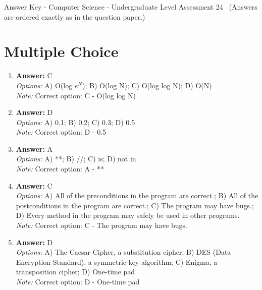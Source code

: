 \documentclass[12pt]{article}
\begin{document}
\begin{center}
Answer Key - Computer Science - Undergraduate Level Assessment 24 \
\small (Answers are ordered exactly as in the question paper.)
\end{center}

\section*{Multiple Choice}
\begin{enumerate}[label=\arabic*.]
\item \textbf{Answer:} C
\\ \textit{Options:} A) O(log $e^N$); B) O(log N); C) O(log log N); D) O(N)
\\ \textit{Note:} Correct option: C - O(log log N)
\item \textbf{Answer:} D
\\ \textit{Options:} A) 0.1; B) 0.2; C) 0.3; D) 0.5
\\ \textit{Note:} Correct option: D - 0.5
\item \textbf{Answer:} A
\\ \textit{Options:} A) **; B) //; C) is; D) not in
\\ \textit{Note:} Correct option: A - **
\item \textbf{Answer:} C
\\ \textit{Options:} A) All of the preconditions in the program are correct.; B) All of the postconditions in the program are correct.; C) The program may have bugs.; D) Every method in the program may safely be used in other programs.
\\ \textit{Note:} Correct option: C - The program may have bugs.
\item \textbf{Answer:} D
\\ \textit{Options:} A) The Caesar Cipher, a substitution cipher; B) DES (Data Encryption Standard), a symmetric-key algorithm; C) Enigma, a transposition cipher; D) One-time pad
\\ \textit{Note:} Correct option: D - One-time pad
\end{enumerate}
\end{document}
